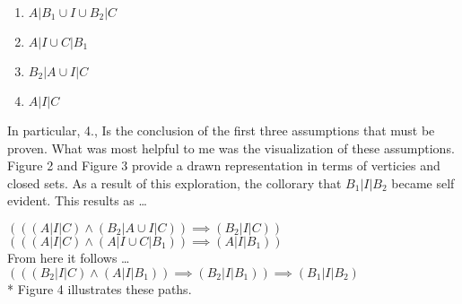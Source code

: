 \documentclass[a4paper,man,natbib]{apa6}
\begin{document}
\begin{enumerate}

      \item $ A | B_1 \cup I \cup B_2 | C $

      \item $ A | I \cup C | B_1 $

      \item $ B_2 | A \cup I | C $

      \item $ A | I | C $

\end{enumerate}

\noindent
In particular, 4., Is the conclusion of the first three assumptions that must be proven. 
What was most helpful to me was the visualization of these assumptions. 
Figure 2 and Figure 3 provide a drawn representation in terms of verticies and closed sets. 
As a result of this exploration, the collorary that $ B_1 | I | B_2 $ became self evident.
This results as \dots 

\begin{center}

      $ (((A | I | C) \land (B_2 | A \cup I | C)) \implies (B_2 | I | C)) $ \\
      $ (((A | I | C) \land (A | I \cup C | B_1)) \implies (A | I | B_1)) $ \\
      From here it follows \dots \\
      $ (((B_2 | I | C) \land (A | I | B_1)) \implies (B_2 | I | B_1)) \implies (B_1 | I | B_2) $ \\
      * Figure 4 illustrates these paths.

\end{center}
\end{document}
